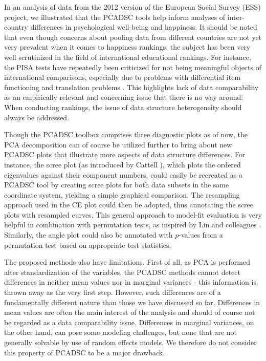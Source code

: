 \documentclass[a4paper,14pt]{article}
\begin{document}
In an analysis of data from the 2012 version of the European Social Survey (ESS) project, we illustrated that the PCADSC tools help inform analyses of inter-country differences in psychological well-being and happiness. It should be noted that even though concerns about pooling data from different countries are not yet very prevalent when it comes to happiness rankings, the subject has been very well scrutinized in the field of international educational rankings. For instance, the PISA tests have repeatedly been criticized for not being meaningful objects of international comparisons, especially due to problems with differential item functioning \cite{Kankaras2014,Kreiner2014,ZwitserEtAl2017} and translation problems \cite{Asil2016}. This highlights lack of data comparability as an empirically relevant and concerning issue that there is no way around: When conducting rankings, the issue of data structure heterogeneity should always be addressed.

Though the PCADSC toolbox comprises three diagnostic plots as of now, the PCA decomposition can of course be utilized further to bring about new PCADSC plots that illustrate more aspects of data structure differences. For instance, the scree plot (as introduced by Cattell \cite{Cattell1966}), which plots the ordered eigenvalues against their component numbers, could easily be recreated as a PCADSC tool by creating scree plots for both data subsets in the same coordinate system, yielding a simple graphical comparison. The resampling approach used in the CE plot could then be adopted, thus annotating the scree plots with resampled curves. This general approach to model-fit evaluation is very helpful in combination with permutation tests, as inspired by Lin and colleagues \cite{LinEtAl2002}. Similarly, the angle plot could also be annotated with $p$-values from a permutation test based on appropriate test statistics.

The proposed methods also have limitations. First of all, as PCA is performed after standardization of the variables, the PCADSC methods cannot detect differences in neither mean values nor in marginal variances - this information is thrown away as the very first step. However, such differences are of a fundamentally different nature than those we have discussed so far. Differences in mean values are often the main interest of the analysis and should of course not be regarded as a data comparability issue. Differences in marginal variances, on the other hand, can pose some modeling challenges, but none that are not generally solvable by use of random effects models. We therefore do not consider this property of PCADSC to be a major drawback.
\end{document}
